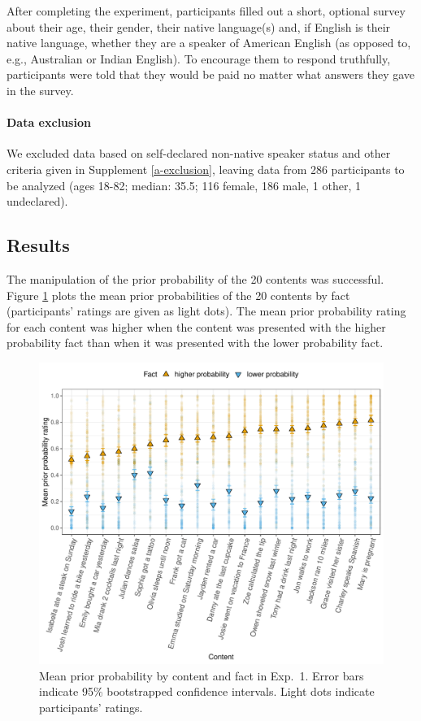 \documentclass[11pt,fleqn]{article}
\newcommand{\6}{\mbox{$[\hspace*{-.6mm}[$}}
\newcommand{\9}{\mbox{$]\hspace*{-.6mm}]$}}
\begin{document}
After completing the experiment, participants filled out a short, optional survey about their age, their gender, their native language(s) and, if English is their native language, whether they are a speaker of American English (as opposed to, e.g., Australian or Indian English). To encourage them to respond truthfully, participants were told that they would be paid no matter what answers they gave in the survey.

\paragraph{Data exclusion} We excluded data based on self-declared non-native speaker status and other criteria given in Supplement \ref{a-exclusion}, leaving data from 286 participants to be analyzed (ages 18-82; median: 35.5; 116 female, 186 male, 1 other, 1 undeclared).

\subsection{Results}

The manipulation of the prior probability of the 20 contents was successful. Figure \ref{f-prior} plots the mean prior probabilities of the 20 contents by fact (participants' ratings are given as light dots). The mean prior probability rating for each content was higher when the content was presented with the higher probability fact than when it was presented with the lower probability fact.

\begin{figure}[h!]
\centering
\includegraphics[width=.75\paperwidth]{../../results/exp4/graphs/prior-ratings}

\caption{Mean prior probability by content and fact in Exp.~1. Error bars indicate 95\% bootstrapped confidence intervals. Light dots indicate participants' ratings.} 
\label{f-prior}
\end{figure}
\end{document}
